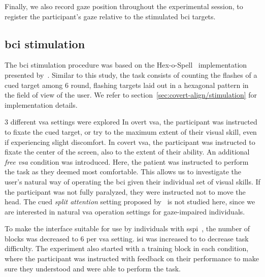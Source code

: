 Finally, we also record gaze position throughout the experimental session, to
register the participant's gaze relative to the stimulated \ac{bci} targets.

\subsection{\Ac{bci} stimulation}

The \ac{bci} stimulation procedure was based on the
Hex-o-Spell~\cite{Treder2010} implementation presented
by~\textcite{VanDenKerchove2024}.
Similar to this study, the task consists of counting the flashes of a cued
target among 6 round, flashing targets laid out in a hexagonal pattern in the
field of view of the user.
We refer to section~\ref{sec:covert-align/stimulation} for implementation details.

3 different \ac{vsa} settings were explored
In overt \ac{vsa}, the participant was instructed to fixate the cued target, or
try to the maximum extent of their visual skill, even if experiencing slight
discomfort.
In covert \ac{vsa}, the participant was instructed to fixate the center of the
screen, also to the extent of their ability.
An additional \emph{free \ac{vsa}} condition was introduced.
Here, the patient was instructed to perform the task as they deemed most
comfortable.
This allows us to investigate the user's natural way of operating the \ac{bci}
given their individual set of visual skills.
If the participant was not fully paralyzed, they were instructed not to move the head.
The cued \emph{split attention} setting proposed
by~\textcite{VanDenKerchove2024} is not studied here, since we are interested
in natural \ac{vsa} operation settings for gaze-impaired individuals.

To make the interface suitable for use by individuals with
\ac{sspi}~\cite{FriedOken2020}, the
number of blocks was decreased to 6 per \ac{vsa} setting.
\Ac{isi} was increased to to decrease task difficulty.
The experiment also started with a training block in each condition, where the
participant was instructed with feedback on their performance to make sure they
understood and were able to perform the task.

